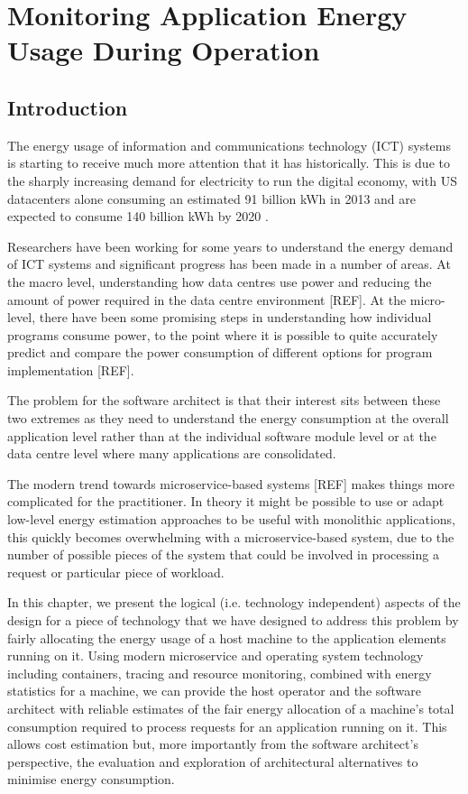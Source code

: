 \chapter{Monitoring Application Energy Usage During Operation}



\section{Introduction}

The energy usage of information and communications technology (ICT) systems is starting to receive much more attention that it has historically.  This is due to the sharply increasing demand for electricity to run the digital economy, with US datacenters alone consuming an estimated 91 billion kWh in 2013 and are expected to consume 140 billion kWh by 2020 \cite{delforge2014-datacentreenergy}.

Researchers have been working for some years to understand the energy demand of ICT systems and significant progress has been made in a number of areas.  At the macro level, understanding how data centres use power and reducing the amount of power required in the data centre environment [REF].  At the micro-level, there have been some promising steps in understanding how individual programs consume power, to the point where it is possible to quite accurately predict and compare the power consumption of different options for program implementation [REF].

The problem for the software architect is that their interest sits between these two extremes as they need to understand the energy consumption at the overall application level rather than at the individual software module level or at the data centre level where many applications are consolidated.

The modern trend towards microservice-based systems [REF] makes things more complicated for the practitioner.  In theory it might be possible to use or adapt low-level energy estimation approaches to be useful with monolithic applications, this quickly becomes overwhelming with a microservice-based system, due to the number of possible pieces of the system that could be involved in processing a request or particular piece of workload.

In this chapter, we present the logical (i.e. technology independent) aspects of the design for a piece of technology that we have designed to address this problem by fairly allocating the energy usage of a host machine to the application elements running on it.  Using modern microservice and operating system technology including containers, tracing and resource monitoring, combined with energy statistics for a machine, we can provide the host operator and the software architect with reliable estimates of the fair energy allocation of a machine's total consumption required to process requests for an application running on it.  This allows cost estimation but, more importantly from the software architect's perspective, the evaluation and exploration of architectural alternatives to minimise energy consumption.


